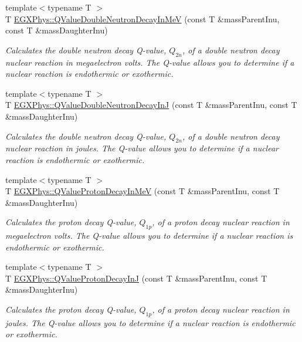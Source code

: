 \begin{DoxyCompactItemize}
{\footnotesize template$<$typename T $>$ }\\T \hyperlink{group___q_value_ga6bfea723aca78b32ea67cc1ca7b4031b}{E\+G\+X\+Phys\+::\+Q\+Value\+Double\+Neutron\+Decay\+In\+MeV} (const T \&mass\+Parent\+Inu, const T \&mass\+Daughter\+Inu)
\begin{DoxyCompactList}\small\item\em Calculates the double neutron decay Q-\/value, $Q_{2n}$, of a double neutron decay nuclear reaction in megaelectron volts. The Q-\/value allows you to determine if a nuclear reaction is endothermic or exothermic. \end{DoxyCompactList}\item 
{\footnotesize template$<$typename T $>$ }\\T \hyperlink{group___q_value_gada1ace2aa0a791df382f120767a56fe9}{E\+G\+X\+Phys\+::\+Q\+Value\+Double\+Neutron\+Decay\+InJ} (const T \&mass\+Parent\+Inu, const T \&mass\+Daughter\+Inu)
\begin{DoxyCompactList}\small\item\em Calculates the double neutron decay Q-\/value, $Q_{2n}$, of a double neutron decay nuclear reaction in joules. The Q-\/value allows you to determine if a nuclear reaction is endothermic or exothermic. \end{DoxyCompactList}\item 
{\footnotesize template$<$typename T $>$ }\\T \hyperlink{group___q_value_ga514354518df3bf1cde561b6d75879ef0}{E\+G\+X\+Phys\+::\+Q\+Value\+Proton\+Decay\+In\+MeV} (const T \&mass\+Parent\+Inu, const T \&mass\+Daughter\+Inu)
\begin{DoxyCompactList}\small\item\em Calculates the proton decay Q-\/value, $Q_{1p}$, of a proton decay nuclear reaction in megaelectron volts. The Q-\/value allows you to determine if a nuclear reaction is endothermic or exothermic. \end{DoxyCompactList}\item 
{\footnotesize template$<$typename T $>$ }\\T \hyperlink{group___q_value_gaa344322393356bd442d17c992628218a}{E\+G\+X\+Phys\+::\+Q\+Value\+Proton\+Decay\+InJ} (const T \&mass\+Parent\+Inu, const T \&mass\+Daughter\+Inu)
\begin{DoxyCompactList}\small\item\em Calculates the proton decay Q-\/value, $Q_{1p}$, of a proton decay nuclear reaction in joules. The Q-\/value allows you to determine if a nuclear reaction is endothermic or exothermic. \end{DoxyCompactList}\item 

\end{DoxyCompactItemize}
